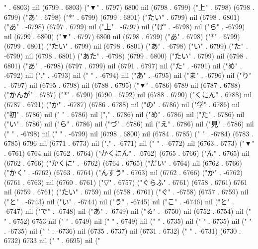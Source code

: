 " . 6803) nil (6799 . 6803) ("▼" . 6797) 6800 nil (6798 . 6799) ("上" . 6798) (6798 . 6799) ("あ" . 6798) ("*" . 6799) (6799 . 6801) ("たい" . 6799) nil (6798 . 6801) ("あ" . -6798) (6797 . 6799) nil ("上" . -6797) nil ("げ" . -6798) nil ("ら" . -6799) nil (6799 . 6800) ("▼" . 6797) 6800 nil (6798 . 6799) ("あ" . 6798) ("*" . 6799) (6799 . 6801) ("たい" . 6799) nil (6798 . 6801) ("あ" . -6798) ("い" . 6799) ("た" . -6799) nil (6798 . 6801) ("あた" . -6798) (6799 . 6800) ("たい" . 6799) nil (6798 . 6801) ("あ" . -6798) (6797 . 6799) nil (6791 . 6797) nil ("た" . -6791) nil ("め" . -6792) nil ("," . -6793) nil (" " . -6794) nil ("あ" . -6795) nil ("ま" . -6796) nil ("り" . -6797) nil (6795 . 6798) nil (6788 . 6795) ("▼" . 6786) 6789 nil (6787 . 6788) ("かんが" . 6787) ("*" . 6790) (6790 . 6792) nil (6788 . 6790) ("くにん" . 6788) nil (6787 . 6791) ("か" . -6787) (6786 . 6788) nil ("の" . 6786) nil ("学" . 6786) nil ("初" . 6786) nil (" " . 6786) nil ("," . 6786) nil ("め" . 6786) nil ("た" . 6786) nil ("い" . 6786) nil ("ら" . 6786) nil ("づ" . 6786) nil ("え" . 6786) nil ("見" . 6786) nil ("
" . -6798) nil (" " . -6799) nil (6798 . 6800) nil (6784 . 6785) (" " . -6784) (6783 . 6785) 6796 nil (6771 . 6773) nil ("," . -6771) nil (" " . -6772) nil (6763 . 6773) ("▼" . 6761) 6764 nil (6762 . 6764) ("かくにん" . -6762) (6765 . 6766) ("ん" . 6765) nil (6762 . 6766) ("かくに" . -6762) (6764 . 6765) ("だい" . 6764) nil (6762 . 6766) ("かく" . -6762) (6763 . 6764) ("んすう" . 6763) nil (6762 . 6766) ("か" . -6762) (6761 . 6763) nil (6760 . 6761) ("▽" . 6757) ("ぐらふ" . 6761) (6758 . 6761) 6761 nil (6759 . 6761) ("たい" . 6759) nil (6758 . 6761) ("ぐ" . -6758) (6757 . 6759) nil ("と" . -6743) nil ("い" . -6744) nil ("う" . -6745) nil ("こ" . -6746) nil ("と" . -6747) nil ("で" . -6748) nil ("あ" . -6749) nil ("る" . -6750) nil (6752 . 6754) nil (" " . 6752) 6753 nil (" " . 6749) nil ("
" . 6749) nil (" " . 6735) nil ("
" . 6735) nil ("
" . -6735) nil (" " . -6736) nil (6735 . 6737) nil (6731 . 6732) (" " . -6731) (6730 . 6732) 6733 nil (" " . 6695) nil ("

